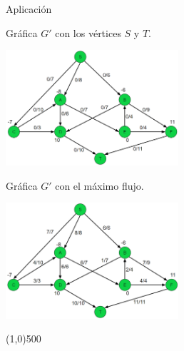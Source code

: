 \documentclass{article}
\begin{document}
\begin{section}{Aplicación}
	\begin{multicols}{2}
		
		\centering Gráfica $G'$ con los vértices $S$ y $T$.
		
		\includegraphics[width=0.48\textwidth]{graph-source-sink}
		
		Gráfica $G'$ con el máximo flujo.
		
		\includegraphics[width=0.48\textwidth]{graph-flows-assigned}
		
	\end{multicols}
	
	\line(1,0){500}
	
\end{section}
\end{document}

